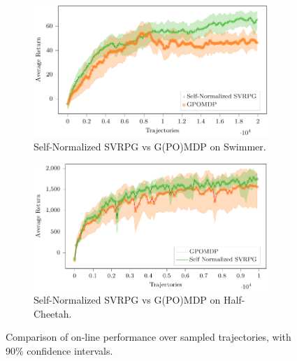 \documentclass{article}
\theoremstyle{remark}
\theoremstyle{definition}
\begin{document}
\begin{figure}[t]
    \begin{subfigure}[b]{.49\textwidth}
	\includegraphics[width=0.98\textwidth]{swimmer_self_normalized_SVRPG_vs_GPOMDP_tex.pdf}
	\vspace{-0.1in}
	\caption{Self-Normalized SVRPG vs G(PO)MDP on Swimmer.}
	\label{fig:swimmerone}
    \end{subfigure}\hfill
    \begin{subfigure}[b]{.49\textwidth}
    	\includegraphics[width=0.98\textwidth]{half_cheetah_Self_Normalized_SVRPG_vs_GPOMDP.pdf}
    	\vspace{-0.1in}
    	\caption{Self-Normalized SVRPG vs G(PO)MDP on Half-Cheetah.}
    	\label{fig:cheetah}
    \end{subfigure}
    \caption{Comparison of on-line performance over sampled trajectories, with 90\% confidence intervals.}
\end{figure}
\end{document}
